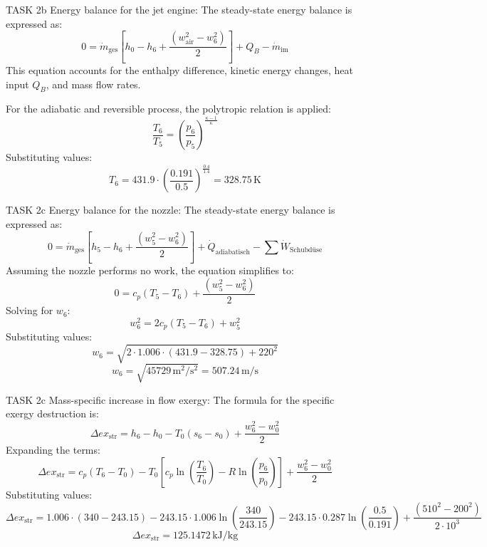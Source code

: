 TASK 2b  
Energy balance for the jet engine:  
The steady-state energy balance is expressed as:  
\[
0 = \dot{m}_{\text{ges}} \left[ h_0 - h_6 + \frac{(w_{\text{air}}^2 - w_6^2)}{2} \right] + Q_B - \dot{m}_{\text{im}}
\]  
This equation accounts for the enthalpy difference, kinetic energy changes, heat input \( Q_B \), and mass flow rates.  

For the adiabatic and reversible process, the polytropic relation is applied:  
\[
\frac{T_6}{T_5} = \left( \frac{p_6}{p_5} \right)^{\frac{\kappa - 1}{\kappa}}
\]  
Substituting values:  
\[
T_6 = 431.9 \cdot \left( \frac{0.191}{0.5} \right)^{\frac{0.4}{1.4}} = 328.75 \, \text{K}
\]  

TASK 2c  
Energy balance for the nozzle:  
The steady-state energy balance is expressed as:  
\[
0 = \dot{m}_{\text{ges}} \left[ h_5 - h_6 + \frac{(w_5^2 - w_6^2)}{2} \right] + \dot{Q}_{\text{adiabatisch}} - \sum \dot{W}_{\text{Schubdüse}}
\]  
Assuming the nozzle performs no work, the equation simplifies to:  
\[
0 = c_p (T_5 - T_6) + \frac{(w_5^2 - w_6^2)}{2}
\]  
Solving for \( w_6 \):  
\[
w_6^2 = 2 c_p (T_5 - T_6) + w_5^2
\]  
Substituting values:  
\[
w_6 = \sqrt{2 \cdot 1.006 \cdot (431.9 - 328.75) + 220^2}
\]  
\[
w_6 = \sqrt{45729 \, \text{m}^2/\text{s}^2} = 507.24 \, \text{m/s}
\]  

TASK 2c  
Mass-specific increase in flow exergy:  
The formula for the specific exergy destruction is:  
\[
\Delta ex_{\text{str}} = h_6 - h_0 - T_0 (s_6 - s_0) + \frac{w_6^2 - w_0^2}{2}
\]  
Expanding the terms:  
\[
\Delta ex_{\text{str}} = c_p (T_6 - T_0) - T_0 \left[ c_p \ln \left( \frac{T_6}{T_0} \right) - R \ln \left( \frac{p_6}{p_0} \right) \right] + \frac{w_6^2 - w_0^2}{2}
\]  
Substituting values:  
\[
\Delta ex_{\text{str}} = 1.006 \cdot (340 - 243.15) - 243.15 \cdot 1.006 \ln \left( \frac{340}{243.15} \right) - 243.15 \cdot 0.287 \ln \left( \frac{0.5}{0.191} \right) + \frac{(510^2 - 200^2)}{2 \cdot 10^3}
\]  
\[
\Delta ex_{\text{str}} = 125.1472 \, \text{kJ/kg}
\]